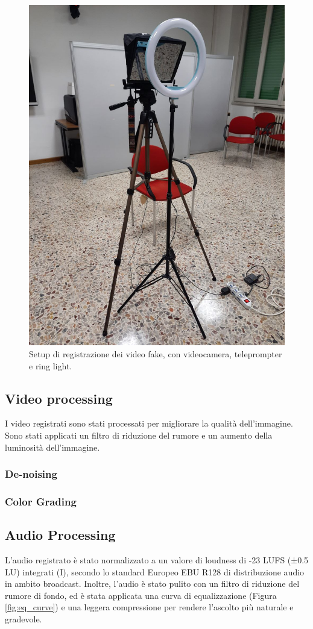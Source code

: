 \begin{figure}[t]
    \centering
    \includegraphics[width=0.62\linewidth]{images/recording_setup}
    \caption{Setup di registrazione dei video fake, con videocamera, teleprompter e ring light.}
    \label{fig:recording_setup}
\end{figure}

\subsection{Video processing}

I video registrati sono stati processati per migliorare la qualità dell'immagine. Sono stati applicati un filtro di riduzione del rumore e un aumento della luminosità dell'immagine.

\subsubsection{De-noising}

\subsubsection{Color Grading}

\subsection{Audio Processing}

L'audio registrato è stato normalizzato a un valore di loudness di -23 LUFS (±0.5 LU) integrati (I), secondo lo standard Europeo EBU R128 di distribuzione audio in ambito broadcast. Inoltre, l'audio è stato pulito con un filtro di riduzione del rumore di fondo, ed è stata applicata una curva di equalizzazione (Figura \ref{fig:eq_curve}) e una leggera compressione per rendere l'ascolto più naturale e gradevole.


